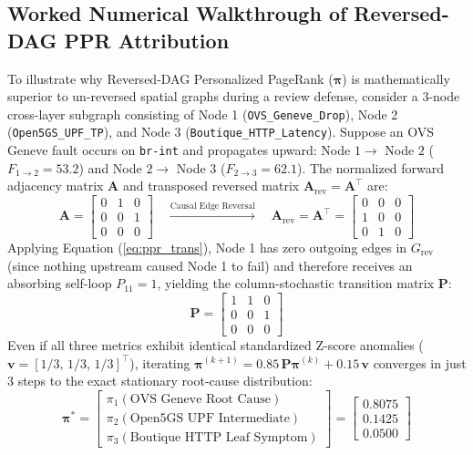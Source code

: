 \subsection{Worked Numerical Walkthrough of Reversed-DAG PPR Attribution}
To illustrate why Reversed-DAG Personalized PageRank ($\boldsymbol{\pi}$) is mathematically superior to un-reversed spatial graphs during a review defense, consider a 3-node cross-layer subgraph consisting of Node 1 (\texttt{OVS\_Geneve\_Drop}), Node 2 (\texttt{Open5GS\_UPF\_TP}), and Node 3 (\texttt{Boutique\_HTTP\_Latency}). Suppose an OVS Geneve fault occurs on \texttt{br-int} and propagates upward: Node $1 \to$ Node $2$ ($F_{1\to 2} = 53.2$) and Node $2 \to$ Node $3$ ($F_{2\to 3} = 62.1$). The normalized forward adjacency matrix $\mathbf{A}$ and transposed reversed matrix $\mathbf{A}_{\text{rev}} = \mathbf{A}^\top$ are:
\begin{equation}
\mathbf{A} = \begin{bmatrix} 0 & 1 & 0 \\ 0 & 0 & 1 \\ 0 & 0 & 0 \end{bmatrix} \quad \xrightarrow{\text{Causal Edge Reversal}} \quad \mathbf{A}_{\text{rev}} = \mathbf{A}^\top = \begin{bmatrix} 0 & 0 & 0 \\ 1 & 0 & 0 \\ 0 & 1 & 0 \end{bmatrix}
\end{equation}
Applying Equation (\ref{eq:ppr_trans}), Node 1 has zero outgoing edges in $G_{\text{rev}}$ (since nothing upstream caused Node 1 to fail) and therefore receives an absorbing self-loop $P_{11} = 1$, yielding the column-stochastic transition matrix $\mathbf{P}$:
\begin{equation}
\mathbf{P} = \begin{bmatrix} 1 & 1 & 0 \\ 0 & 0 & 1 \\ 0 & 0 & 0 \end{bmatrix}
\end{equation}
Even if all three metrics exhibit identical standardized Z-score anomalies ($\mathbf{v} = [1/3, \, 1/3, \, 1/3]^\top$), iterating $\boldsymbol{\pi}^{(k+1)} = 0.85 \, \mathbf{P} \boldsymbol{\pi}^{(k)} + 0.15 \, \mathbf{v}$ converges in just 3 steps to the exact stationary root-cause distribution:
\begin{equation}
\boldsymbol{\pi}^* = \begin{bmatrix} \pi_1 (\text{OVS Geneve Root Cause}) \\ \pi_2 (\text{Open5GS UPF Intermediate}) \\ \pi_3 (\text{Boutique HTTP Leaf Symptom}) \end{bmatrix} = \begin{bmatrix} \mathbf{0.8075} \\ 0.1425 \\ 0.0500 \end{bmatrix}
\end{equation}
